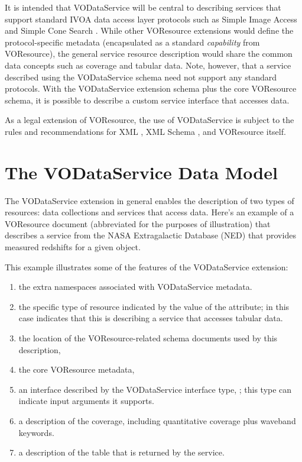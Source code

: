 \documentclass[11pt,a4paper]{ivoa}
\begin{document}
It is intended that VODataService will be central to describing
services that support standard IVOA data access layer protocols such
as Simple Image Access \citep{2015ivoa.spec.1223D} and Simple Cone Search
\citep{2008ivoa.specQ0222P}.  While other VOResource extensions would
define the protocol-specific metadata (encapsulated as a standard
\emph{capability} from VOResource), the general service
resource description would share the common data concepts such as
coverage and tabular data.  Note, however, that a service described
using the VODataService schema need not support any standard
protocols.  With the VODataService extension schema plus the core
VOResource schema, it is possible to describe a custom service
interface that accesses data.  



As a legal extension of VOResource, the use
of VODataService is subject to the rules and recommendations for XML
\citep{std:XML}, XML Schema \citep{std:XSD},
and VOResource itself.  


\section{The VODataService Data Model}


The VODataService extension in general enables the description of two
types of resources:  data collections and services that access data.
Here's an example of a VOResource document (abbreviated for the
purposes of illustration) that describes a service from the NASA
Extragalactic Database (NED) that provides measured redshifts for a
given object.




This example illustrates some of the features of the VODataService
extension:

\begin{enumerate}
\item the extra namespaces associated with
       VODataService metadata.
\item the specific type of resource indicated by
       the value of the  attribute; in this case
        indicates that this is
       describing a service that accesses tabular data.
\item the location of the VOResource-related schema 
       documents used by this description,
\item the core VOResource metadata,
\item an interface described by the
       VODataService interface type, ; this
       type can indicate input arguments it supports.
\item a description of the
       coverage, including quantitative coverage
       plus waveband keywords.
\item a description of the table that is returned
       by the service.
\end{enumerate}
\end{document}
